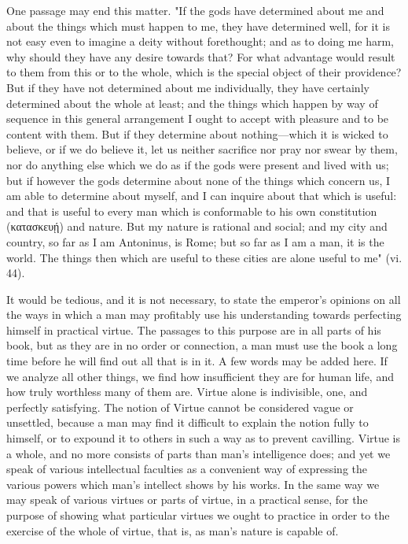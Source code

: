 One passage may end this matter. "If the gods have determined about me and about the things which must happen to me, they have determined well, for it is not easy even to imagine a deity without forethought; and as to doing me harm, why should they have any desire towards that? For what advantage would result to them from this or to the whole, which is the special object of their providence? But if they have not determined about me individually, they have certainly determined about the whole at least; and the things which happen by way of sequence in this general arrangement I ought to accept with pleasure and to be content with them. But if they determine about nothing—which it is wicked to believe, or if we do believe it, let us neither sacrifice nor pray nor swear by them, nor do anything else which we do as if the gods were present and lived with us; but if however the gods determine about none of the things which concern us, I am able to determine about myself, and I can inquire about that which is useful: and that is useful to every man which is conformable to his own constitution (\textgreek{κατασκευῄ}) and nature. But my nature is rational and social; and my city and country, so far as I am Antoninus, is Rome; but so far as I am a man, it is the world. The things then which are useful to these cities are alone useful to me" (vi. 44).

It would be tedious, and it is not necessary, to state the emperor's opinions on all the ways in which a man may profitably use his understanding towards perfecting himself in practical virtue. The passages to this purpose are in all parts of his book, but as they are in no order or connection, a man must use the book a long time before he will find out all that is in it. A few words may be added here. If we analyze all other things, we find how insufficient they are for human life, and how truly worthless many of them are. Virtue alone is indivisible, one, and perfectly satisfying. The notion of Virtue cannot be considered vague or unsettled, because a man may find it difficult to explain the notion fully to himself, or to expound it to others in such a way as to prevent cavilling. Virtue is a whole, and no more consists of parts than man's intelligence does; and yet we speak of various intellectual faculties as a convenient way of expressing the various powers which man's intellect shows by his works. In the same way we may speak of various virtues or parts of virtue, in a practical sense, for the purpose of showing what particular virtues we ought to practice in order to the exercise of the whole of virtue, that is, as man's nature is capable of.

